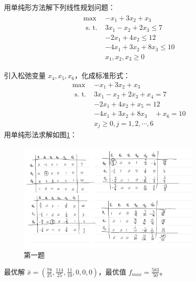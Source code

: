 

\newcommand\Title{最优化方法第5次作业}




\begin{problem}
    用单纯形方法解下列线性规划问题：
    \begin{align*}
        \begin{array}{cl}
            \max & -x_{1}+3 x_{2}+x_{3} \\
            \text { s. t. } & 3 x_{1}-x_{2}+2 x_{3} \leqslant 7 \\
            & -2 x_{1}+4 x_{2} \leqslant 12 \\
            & -4 x_{1}+3 x_{2}+8 x_{3} \leqslant 10 \\
            & x_{1}, x_{2}, x_{3} \geqslant 0 
        \end{array}
    \end{align*}
\end{problem}
\begin{solution}
    引入松弛变量 $x_4, x_5, x_6$，化成标准形式：
    \begin{align*}
        \max& -x_{1}+3 x_{2}+x_{3}\\
        \text { s. t. }& 3 x_{1}-x_{2}+2 x_{3}+x_{4}=7\\
        &-2 x_{1}+4 x_{2}+x_{5}=12 \\
        &-4 x_{1}+3 x_{2}+8 x_{3} \quad+x_{6}=10\\
        &x_{j} \geqslant 0, j=1,2, \cdots, 6 
    \end{align*}
    用单纯形法求解如图\ref{fig1}：
    \begin{figure}[htbp]
        \centering
        \includegraphics[width=0.8\textwidth]{./figures/img1.png}
        \caption{第一题 \label{fig1}}
    \end{figure}

    最优解 $\bar{x} = \left(\frac{78}{25}, \frac{114}{25}, \frac{11}{10}, 0, 0, 0\right)$，最优值 $f_{max} = \frac{583}{50}$。

\end{solution}

